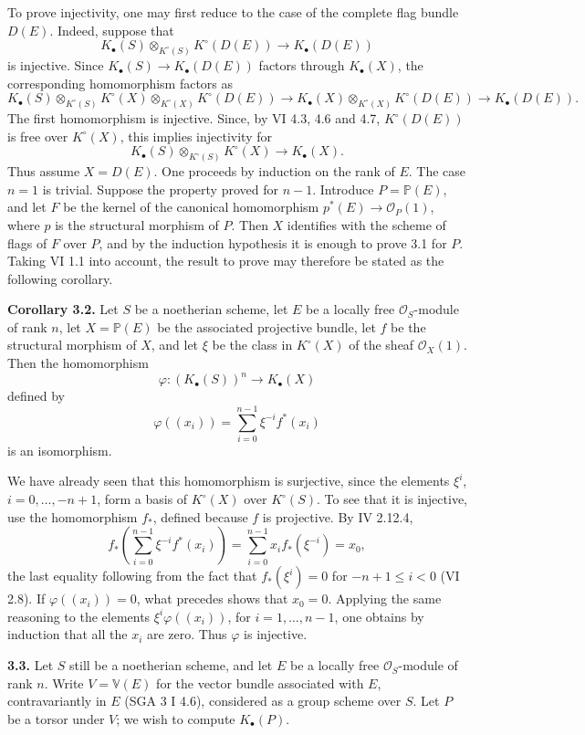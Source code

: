 \documentclass[11pt]{article}
\begin{document}
To prove injectivity, one may first reduce to the case of the complete flag bundle $D(E)$. Indeed, suppose that
\[
 K_\bullet(S)\otimes_{K^\circ(S)}K^\circ(D(E))\longrightarrow K_\bullet(D(E))
\]
is injective. Since $K_\bullet(S)\to K_\bullet(D(E))$ factors through $K_\bullet(X)$, the corresponding homomorphism factors as
\[
 K_\bullet(S)\otimes_{K^\circ(S)}K^\circ(X)\otimes_{K^\circ(X)}K^\circ(D(E))
 \longrightarrow
 K_\bullet(X)\otimes_{K^\circ(X)}K^\circ(D(E))
 \longrightarrow K_\bullet(D(E)).
\]
The first homomorphism is injective. Since, by VI 4.3, 4.6 and 4.7, $K^\circ(D(E))$ is free over $K^\circ(X)$, this implies injectivity for
\[
 K_\bullet(S)\otimes_{K^\circ(S)}K^\circ(X)\to K_\bullet(X).
\]
Thus assume $X=D(E)$. One proceeds by induction on the rank of $E$. The case $n=1$ is trivial. Suppose the property proved for $n-1$. Introduce $P=\mathbb P(E)$, and let $F$ be the kernel of the canonical homomorphism $p^*(E)\to\mathcal O_P(1)$, where $p$ is the structural morphism of $P$. Then $X$ identifies with the scheme of flags of $F$ over $P$, and by the induction hypothesis it is enough to prove 3.1 for $P$. Taking VI 1.1 into account, the result to prove may therefore be stated as the following corollary.

\textbf{Corollary 3.2.} Let $S$ be a noetherian scheme, let $E$ be a locally free $\mathcal O_S$-module of rank $n$, let $X=\mathbb P(E)$ be the associated projective bundle, let $f$ be the structural morphism of $X$, and let $\xi$ be the class in $K^\circ(X)$ of the sheaf $\mathcal O_X(1)$. Then the homomorphism
\[
 \varphi:(K_\bullet(S))^n\longrightarrow K_\bullet(X)
\]
defined by
\[
 \varphi((x_i))=\sum_{i=0}^{n-1}\xi^{-i}f^*(x_i)
\]
is an isomorphism.

We have already seen that this homomorphism is surjective, since the elements $\xi^i$, $i=0,\ldots,-n+1$, form a basis of $K^\circ(X)$ over $K^\circ(S)$. To see that it is injective, use the homomorphism $f_*$, defined because $f$ is projective. By IV 2.12.4,
\[
 f_*\left(\sum_{i=0}^{n-1}\xi^{-i}f^*(x_i)\right)
 =\sum_{i=0}^{n-1}x_i f_*(\xi^{-i})=x_0,
\]
the last equality following from the fact that $f_*(\xi^i)=0$ for $-n+1\leq i<0$ (VI 2.8). If $\varphi((x_i))=0$, what precedes shows that $x_0=0$. Applying the same reasoning to the elements $\xi^i\varphi((x_i))$, for $i=1,\ldots,n-1$, one obtains by induction that all the $x_i$ are zero. Thus $\varphi$ is injective.

\textbf{3.3.} Let $S$ still be a noetherian scheme, and let $E$ be a locally free $\mathcal O_S$-module of rank $n$. Write $V=\mathbb V(E)$ for the vector bundle associated with $E$, contravariantly in $E$ (SGA 3 I 4.6), considered as a group scheme over $S$. Let $P$ be a torsor under $V$; we wish to compute $K_\bullet(P)$.
\end{document}
